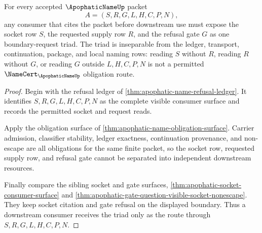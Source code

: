 \begin{theorem}
\label{thm:apophatic-name-boundary-request-obligation-triad}
For every accepted $\ApophaticNameUp$ packet
$$
A=(S,R,G,L,H,C,P,N),
$$
any consumer that cites the packet before downstream use must expose the socket row $S$, the requested supply row $R$, and the refusal gate $G$ as one boundary-request triad. The triad is inseparable from the ledger, transport, continuation, package, and local naming rows: reading $S$ without $R$, reading $R$ without $G$, or reading $G$ outside $L,H,C,P,N$ is not a permitted $\NameCert_{\ApophaticNameUp}$ obligation route.
\end{theorem}
\begin{proof}
Begin with the refusal ledger of \autoref{thm:apophatic-name-refusal-ledger}. It identifies $S,R,G,L,H,C,P,N$ as the complete visible consumer surface and records the permitted socket and request reads.

Apply the obligation surface of \autoref{thm:apophatic-name-obligation-surface}. Carrier admission, classifier stability, ledger exactness, continuation provenance, and non-escape are all obligations for the same finite packet, so the socket row, requested supply row, and refusal gate cannot be separated into independent downstream resources.

Finally compare the sibling socket and gate surfaces, \autoref{thm:apophatic-socket-consumer-surface} and \autoref{thm:apophatic-gate-question-visible-socket-nonescape}. They keep socket citation and gate refusal on the displayed boundary. Thus a downstream consumer receives the triad only as the route through $S,R,G,L,H,C,P,N$.
\end{proof}

